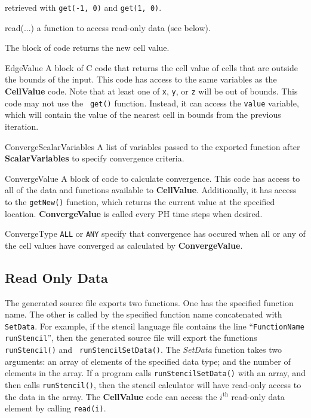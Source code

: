 \documentclass{sig-alternate}
\begin{document}
\begin{description*}
\begin{description*}
  retrieved with {\tt get(-1, 0)} and {\tt get(1, 0)}.
\item[read(...)] a function to access read-only data (see below).
\end{description*}
The block of code returns the new cell value.
\item[EdgeValue] A block of C code that returns the cell value of cells that
  are outside the bounds of the input.  This code has access to the same
  variables as the {\bf CellValue} code.  Note that at least one of {\tt x},
  {\tt y}, or {\tt z} will be out of bounds.  This code may not use the {\tt
    get()} function.  Instead, it can access the {\tt value} variable, which
  will contain the value of the nearest cell in bounds from the previous
  iteration.
\item[ConvergeScalarVariables] A list of variables passed to the export\-ed
  function after {\bf ScalarVariables} to specify convergence criteria.
\item[ConvergeValue] A block of code to calculate convergence.  This code has
  access to all of the data and functions available to {\bf CellValue}.
  Additionally, it has access to the {\tt getNew()} function, which returns
  the current value at the specified location.  {\bf ConvergeValue} is called
  every PH time steps when desired.
\item[ConvergeType] {\tt ALL} or {\tt ANY} specify that convergence has
  occured when all or any of the cell values have converged as calculated by
  {\bf ConvergeValue}.
\end{description*}

\subsection{Read Only Data}

The generated source file exports two functions.  One has the specified
function name.  The other is called by the specified function name
concatenated with {\tt SetData}.  For example, if the stencil language file
contains the line ``{\tt FunctionName runSten\-cil}'', then the generated
source file will export the functions {\tt run\-Stencil()} and {\tt
  runStencilSetData()}.  The {\em SetData} function takes two arguments: an
array of elements of the specified data type; and the number of elements in
the array.  If a program calls {\tt runStencilSetData()} with an array, and
then calls {\tt run\-Stencil()}, then the stencil calculator will have
read-only access to the data in the array.  The {\bf CellValue} code can
access the $i^\text{th}$ read-only data element by calling {\tt read(i)}.
\end{document}
